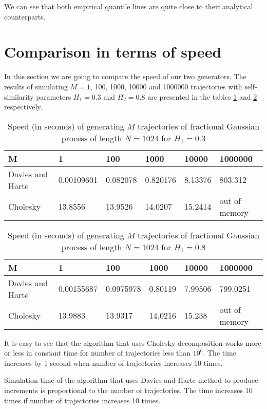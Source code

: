 \documentclass[12pt,titlepage]{article}
\begin{document}
We can see that both empirical quantile lines are quite close to their analytical counterparts.





\section{Comparison in terms of speed}
In this section we are going to compare the speed of our two generators. The results of simulating $M = 1$, 100, 1000, 10000 and 1000000 trajectories with self-similarity parameters $H_1=0.3$ and $H_2 = 0.8$ are presented in the tables \ref{tab:speed03} and \ref{tab:speed08} respectively.

\begin{table}[H]

\footnotesize
\centering
\caption{Speed (in seconds) of generating $M$ trajectories of fractional Gaussian process of length $N=1024$ for $H_1=0.3$}
\label{tab:speed03}
\begin{tabular}{l|lllll}
M    & 1 & 100   & 1000  & 10000   & 1000000     \\ \hline
Davies and Harte  & 0.00109601  & 0.082078 & 0.820176 & 8.13376 & 803.312 \\
Cholesky          & 13.8556     & 13.9526  & 14.0207 & 15.2414 & out of memory
\end{tabular}
\end{table}


\begin{table}[H]

\footnotesize
\centering
\caption{Speed (in seconds) of generating $M$ trajectories of fractional Gaussian process of length $N=1024$ for $H_1=0.8$}
\label{tab:speed08}
\begin{tabular}{l|lllll}
M    & 1 & 100   & 1000   & 10000 & 1000000      \\ \hline
Davies and Harte  & 0.00155687  & 0.0975978 & 0.80119 & 7.99506 & 799.0251 \\
Cholesky          & 13.9883     & 13.9317  & 14.0216 & 15.238  & out of memory
\end{tabular}
\end{table}

It is easy to see that the algorithm that uses Cholesky decomposition works more or less in constant time for number of trajectories less than $10^6$. The time increases by 1 second when number of trajectories increases 10 times. 

Simulation time of the algorithm that uses Davies and Harte method to produce increments is proportional to the number of trajectories. 
The time increases 10 times if number of trajectories increases 10 times. 
\end{document}
